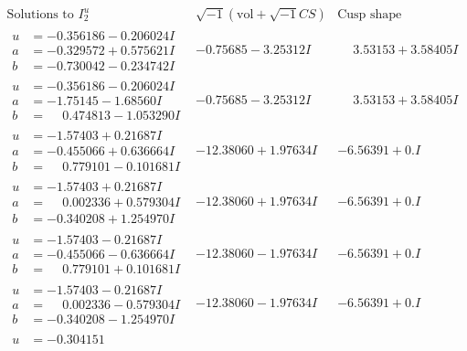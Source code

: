 \documentclass[1p]{elsarticle_modified}
\theoremstyle{definition}
\newcommand{\I}{\sqrt{-1}}
\begin{document}
$$\begin{array}{c|c|c}
\text{Solutions to }I^u_{2}& \I (\text{vol} + \sqrt{-1}CS) & \text{Cusp shape}\\
 \hline 
\begin{aligned}
u &= -0.356186 - 0.206024 I \\
a &= -0.329572 + 0.575621 I \\
b &= -0.730042 - 0.234742 I\end{aligned}
 & -0.75685 - 3.25312 I & \phantom{-}3.53153 + 3.58405 I \\ \hline\begin{aligned}
u &= -0.356186 - 0.206024 I \\
a &= -1.75145 - 1.68560 I \\
b &= \phantom{-}0.474813 - 1.053290 I\end{aligned}
 & -0.75685 - 3.25312 I & \phantom{-}3.53153 + 3.58405 I \\ \hline\begin{aligned}
u &= -1.57403 + 0.21687 I \\
a &= -0.455066 + 0.636664 I \\
b &= \phantom{-}0.779101 - 0.101681 I\end{aligned}
 & -12.38060 + 1.97634 I & -6.56391 + 0. I\phantom{ +0.000000I} \\ \hline\begin{aligned}
u &= -1.57403 + 0.21687 I \\
a &= \phantom{-}0.002336 + 0.579304 I \\
b &= -0.340208 + 1.254970 I\end{aligned}
 & -12.38060 + 1.97634 I & -6.56391 + 0. I\phantom{ +0.000000I} \\ \hline\begin{aligned}
u &= -1.57403 - 0.21687 I \\
a &= -0.455066 - 0.636664 I \\
b &= \phantom{-}0.779101 + 0.101681 I\end{aligned}
 & -12.38060 - 1.97634 I & -6.56391 + 0. I\phantom{ +0.000000I} \\ \hline\begin{aligned}
u &= -1.57403 - 0.21687 I \\
a &= \phantom{-}0.002336 - 0.579304 I \\
b &= -0.340208 - 1.254970 I\end{aligned}
 & -12.38060 - 1.97634 I & -6.56391 + 0. I\phantom{ +0.000000I} \\ \hline\begin{aligned}
u &= -0.304151\phantom{ +0.000000I} \\

\end{aligned}
\end{array}$$
\end{document}
